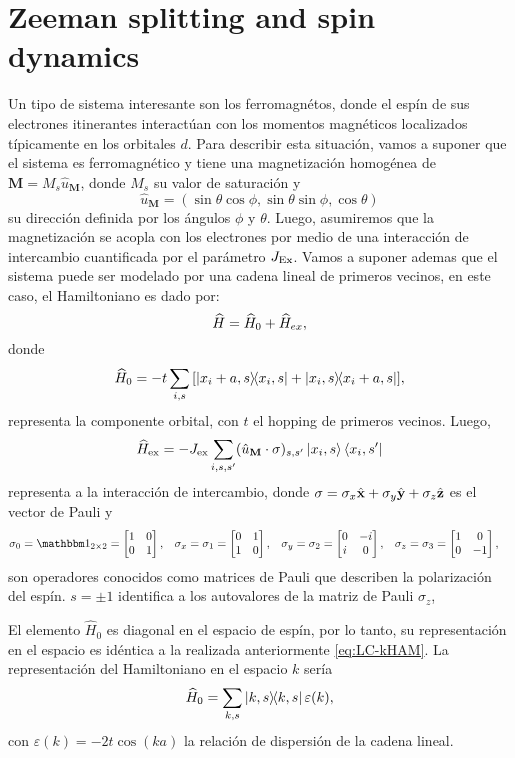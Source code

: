 \section{Zeeman splitting and spin dynamics}

Un tipo de sistema interesante son los ferromagnétos, donde el espín de sus electrones itinerantes interactúan con los momentos  magnéticos localizados típicamente en los orbitales $d$. Para describir esta situación, vamos a suponer que el sistema es ferromagnético y tiene una magnetización homogénea de $\textbf{M}=M_s\hat{u}_{\textbf{M}}$, donde $M_s$ su valor de saturación y \[\hat{u}_{\textbf{M}}=(\sin\theta\cos\phi,\sin\theta\sin\phi,\cos\theta)\] su dirección definida por los ángulos $\phi$ y $\theta$. Luego, asumiremos que la magnetización se acopla con los electrones por medio de una interacción de intercambio cuantificada por el parámetro $J_{\rm Ex }$. Vamos a suponer ademas que el sistema puede ser modelado por una cadena lineal de primeros vecinos, en este caso, el Hamiltoniano es dado por:
\begin{equation}{\label{eq:lc_HAM_Zeeman}}
	\widehat{H} = \widehat{H}_0+\widehat{H}_{ex},
\end{equation}
donde
\begin{equation}
	\widehat{H}_0 =- t  \sum_{i,s} \bqty{\ketbra{x_i + a,s}{x_i,s} + \ketbra{x_i,s}{x_i + a,s}},
\end{equation}
representa la componente orbital, con $t$ el hopping de primeros vecinos. Luego, 
\begin{equation}
	\widehat{H}_{\rm ex} =-J_{\rm ex }  \sum_{i,s,s'} (\hat{u}_{\textbf{M}}\cdot \vb{\sigma})_{s,s'}\ket{x_i,s}\bra{x_i,s'} 
\end{equation}
representa a la interacción de intercambio, donde $ \vb{\sigma}=\sigma_x \hat{\vb x} + \sigma_y \hat{\vb y} + \sigma_z \hat{\vb z} $ es el vector de Pauli y 
\begin{align*}
	\sigma_0 = \mathbbm1_{2\times2}&= \bmqty{\pmat{0}}, & \sigma_x = \sigma_1 &= \bmqty{\pmat{x}}, & \sigma_y = \sigma_2 &= \bmqty{\pmat{y}}, & \sigma_z = \sigma_3 &= \bmqty{\pmat{z}},
\end{align*}
son operadores conocidos como matrices de Pauli que describen la polarización del espín. $s=\pm 1$ identifica a los autovalores de la matriz de Pauli $\sigma_z$, 

El elemento  $\widehat{H}_0$ es diagonal en el espacio de espín, por lo tanto, su representación en el espacio es idéntica a la realizada anteriormente \eqref{eq:LC-kHAM}.
La representación del Hamiltoniano en el espacio $k$ sería
\begin{align*}
	\widehat{H}_0 = \sum_{k, s} \ketbra{k, s} \varepsilon(k) ,
\end{align*}
con $\varepsilon(k)= -2t \cos(ka) $ la relación de dispersión de la cadena lineal.

